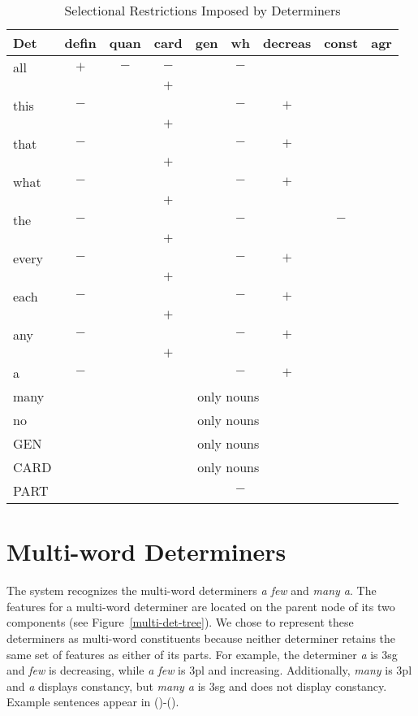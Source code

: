 \begin{table}[hbt]
\vspace*{-2mm}
\centering
\begin{tabular}{|l||c|c|c|c|c|c|c|c|}
\hline
Det&defin&quan&card&gen&wh&decreas&const&agr\\
\hline
\hline
all&$+$&$-$&$-$&&$-$&&&\\
&&&$+$&&&&&\\ \hline
this&$-$&&&&$-$&$+$&&\\
&&&$+$&&&&&\\ \hline
that&$-$&&&&$-$&$+$&&\\
&&&$+$&&&&&\\ \hline
what&$-$&&&&$-$&$+$&&\\
&&&$+$&&&&&\\ \hline
the&$-$&&&&$-$&&$-$&\\ 
&&&$+$&&&&&\\ \hline
every&$-$&&&&$-$&$+$&&\\
&&&$+$&&&&&\\ \hline
each&$-$&&&&$-$&$+$&&\\
&&&$+$&&&&&\\ \hline
any&$-$&&&&$-$&$+$&&\\ 
&&&$+$&&&&&\\ \hline
a&$-$&&&&$-$&$+$&&\\ \hline
many&\multicolumn{8}{c|}{only nouns}\\ \hline
no&\multicolumn{8}{c|}{only nouns}\\ \hline
GEN&\multicolumn{8}{c|}{only nouns}\\ \hline
CARD&\multicolumn{8}{c|}{only nouns}\\ \hline
PART&&&&&$-$&&&\\ \hline
\end{tabular}
\caption{Selectional Restrictions Imposed by Determiners}
\label{det-ordering}
\end{table}


\section{Multi-word Determiners}
The system recognizes the multi-word determiners {\it a few} and {\it many a}.
The features for a multi-word determiner are located on the parent node of its 
two components (see Figure~\ref{multi-det-tree}).  We chose to represent these 
determiners as multi-word constituents because neither determiner retains the 
same set of features as either of its parts.  For example, the determiner 
{\it a} is 3sg and {\it few} is decreasing, while {\it a few} is 3pl and 
increasing.  Additionally, {\it many} is 3pl and {\it a} displays constancy, 
but {\it many a} is 3sg and does not display constancy.  Example sentences 
appear in ()-().


